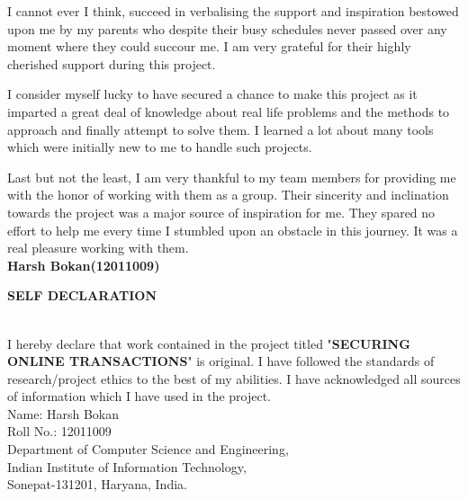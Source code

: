 \documentclass[12pt, oneside, a4paper]{article}
\begin{document}
I cannot ever I think, succeed in verbalising the support and inspiration bestowed upon me by my parents who despite their busy schedules never passed over any moment where they could succour me. I am very grateful for their highly cherished support during this project.

I consider myself lucky to have secured a chance to make this project as it imparted a great deal of knowledge about real life problems and the methods to approach and finally attempt to solve them. I learned a lot about many tools which were initially new to me to handle such projects. 

Last but not the least, I am very thankful to my team members for providing me with the honor of working with them as a group. Their sincerity and inclination towards the project was a major source of inspiration for me. They spared no effort to help me every time I stumbled upon an obstacle in this journey. It was a real pleasure working with them.
\vspace{2cm}\\
\textbf{Harsh Bokan(12011009)}
\setcounter{page}{2}
\pagebreak

\begin{center}
    \begin{Large}\textbf{SELF DECLARATION}\end{Large}
\end{center}\\
\vspace{1cm}
I hereby declare that work contained in the project titled "\textbf{SECURING ONLINE TRANSACTIONS}" is original. I have followed the standards of research/project ethics to the best of my abilities. I have acknowledged all sources of information which I have used in the project.
\vspace{4cm}\\
Name: Harsh Bokan\\
Roll No.: 12011009\\
Department of Computer Science and Engineering,\\
Indian Institute of Information Technology,\\
Sonepat-131201, Haryana, India.
\pagebreak
\end{document}
